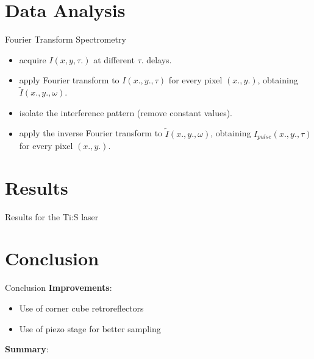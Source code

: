 \documentclass[11pt]{beamer}
\begin{document}
\section{Data Analysis}
\begin{frame}{Fourier Transform Spectrometry}
\begin{itemize}
	\item acquire $I(x,y,\tau.)$ at different $\tau.$ delays.
	\item apply Fourier transform to $I(x.,y.,\tau)$ for every pixel $(x.,y.)$, obtaining $\tilde{I}(x.,y.,\omega)$.
	\item isolate the interference pattern (remove constant values).
	\item apply the inverse Fourier transform to $\tilde{I}(x.,y.,\omega)$, obtaining $I_{pulse}(x.,y.,\tau)$ for every pixel $(x.,y.)$.
\end{itemize}

\end{frame}
\section{Results}
\begin{frame}{Results for the Ti:S laser}

\end{frame}
\section{Conclusion}
\begin{frame}{Conclusion}
\textbf{Improvements}:\\
	\begin{itemize}
		\item Use of corner cube retroreflectors
		\item Use of piezo stage for better sampling
	\end{itemize}
	
	\vspace{5pt}
\textbf{Summary}:\\
\end{frame}
\end{document}
